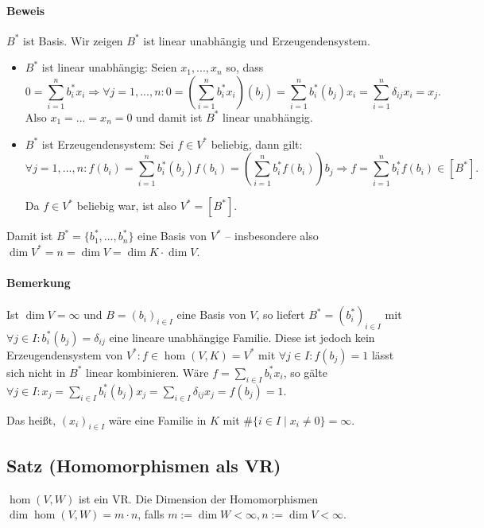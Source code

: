 \paragraph{Beweis} $B^*$ ist Basis. Wir zeigen $B^*$ ist linear unabhängig und Erzeugendensystem.
	\begin{itemize}
            \item $ B^* $ ist linear unabhängig: Seien $ x_1,...,x_n $ so, dass
                    \begin{equation*}
                    0 = \sum_{i=1}^{n}b_i^*x_i \Rightarrow \forall j=1,...,n: 0=(\sum_{i=1}^{n}b_i^*x_i)(b_j) = \sum_{i=1}^{n}b_i^*(b_j)x_i = \sum_{i=1}^{n}\delta_{ij}x_i = x_j.
                    \end{equation*}
            Also $ x_1 = ... = x_n = 0 $ und damit ist $ B^* $ linear unabhängig.
            \item $ B^* $ ist Erzeugendensystem: Sei $ f\in V^* $ beliebig, dann gilt:
            \begin{equation*}
                    \forall j = 1,...,n:f(b_i) = \sum_{i=1}^{n}b_i^*(b_j)f(b_i) = (\sum_{i=1}^{n}b_i^*f(b_i))b_j \Rightarrow f = \sum_{i=1}^{n}b_i^*f(b_i)\in [B^*].
            \end{equation*}
            
            Da $ f\in V^* $ beliebig war, ist also $ V^* = [B^*]$.
	\end{itemize}
	
	Damit ist $ B^* = \{b_1^*,...,b_n^*\}$ eine Basis von $ V^* $ -- insbesondere also $ \dim V^* = n = \dim V = \dim K\cdot \dim V $.

\paragraph{Bemerkung}
	Ist $\dim V = \infty$ und $B=(b_i)_{i\in I}$ eine Basis von $V$, so liefert $B^\ast=(b_i^\ast)_{i\in I}$ mit $\forall j\in I:b_i^\ast(b_j)=\delta_{ij}$ eine lineare unabhängige Familie. Diese ist jedoch kein Erzeugendensystem von $V^\ast: f\in\hom(V,K)=V^\ast$ mit $\forall j\in I:f(b_j)=1$ lässt sich nicht in $B^\ast$ linear kombinieren. Wäre $f=\sum_{i\in I}b_i^\ast x_i$, so gälte $\forall j\in I: x_j =\sum_{i\in I}b_i^\ast(b_j)x_j= \sum_{i\in I} \delta_{ij}x_j = f(b_j) = 1$.

	Das heißt, $(x_i)_{i\in I}$ wäre eine Familie in $ K $ mit $\#\{i\in I\mid x_i\neq 0\}=\infty$.

\subsection{Satz (Homomorphismen als VR)}
	\begin{Satz}
		$ \hom (V,W) $ ist ein VR. Die Dimension der Homomorphismen $\dim\hom (V,W) = m\cdot n$, falls $m:=\dim W<\infty, n:=\dim V< \infty$.
	\end{Satz}
	
